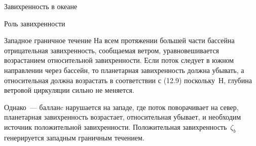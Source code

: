 \begin{chapter}{Завихренность в океане}
\begin{section}{Роль завихренности}
\begin{paragraph}{Западное граничное течение}
На всем протяжении большей части бассейна отрицательная завихренность,
сообщаемая ветром, уравновешивается возрастанием относительной
завихренности. Если поток следует в южном направлении через бассейн,
то планетарная завихренность должна убывать, а относительная должна
возрастать в соответствии с (12.9) поскольку~$Н$, глубина ветровой
циркуляции сильно не меняется.
%

Однако~--- балланc нарушается на западе, где поток поворачивает на
север, планетарная завихренность возрастает, относительная убывает, и
необходим источник положительной завихренности. Положительная
завихренность~$\zeta_{b}$ генерируется западным граничным течением.
%


\end{paragraph}
\end{section}
\end{chapter}
